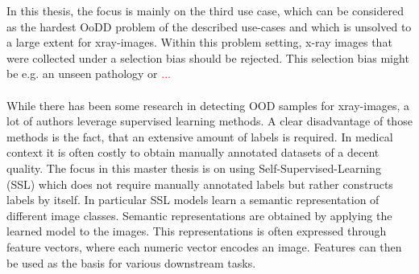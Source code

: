 In this thesis, the focus is mainly on the third use case, which can be considered as the hardest OoDD problem of the described use-cases and which is unsolved to a large extent for xray-images.
Within this problem setting, x-ray images that were collected under a selection bias should be rejected.
This selection bias might be e.g. an unseen pathology or \textcolor{red}{...}
\\
\\
While there has been some research in detecting OOD samples for xray-images, a lot of authors leverage supervised learning methods.
A clear disadvantage of those methods is the fact, that an extensive amount of labels is required.
In medical context it is often costly to obtain manually annotated datasets of a decent quality.
The focus in this master thesis is on using Self-Supervised-Learning (SSL) which does not require manually annotated labels but rather constructs labels by itself. 
In particular SSL models learn a semantic representation of different image classes.
Semantic representations are obtained by applying the learned model to the images.
This representations is often expressed through feature vectors, where each numeric vector encodes an image.
Features can then be used as the basis for various downstream tasks.
